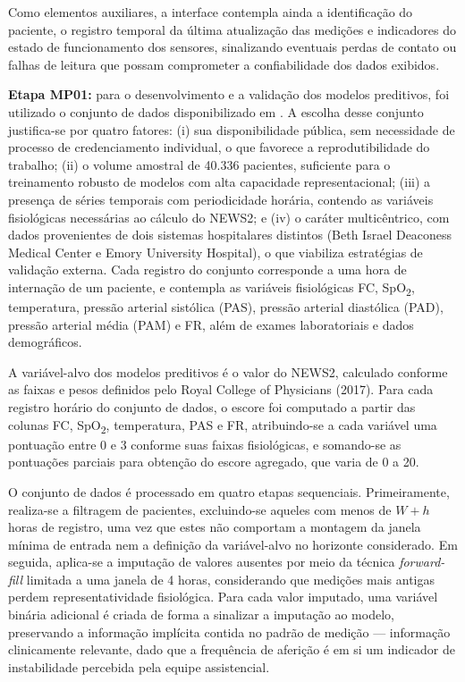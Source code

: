 Como elementos auxiliares, a interface contempla ainda a identificação do paciente, o registro temporal da última atualização das medições e indicadores do estado de funcionamento dos sensores, sinalizando eventuais perdas de contato ou falhas de leitura que possam comprometer a confiabilidade dos dados exibidos.

\textbf{Etapa MP01:} para o desenvolvimento e a validação dos modelos preditivos, foi utilizado o conjunto de dados disponibilizado em \cite{REYNA}. A escolha desse conjunto justifica-se por quatro fatores: (i) sua disponibilidade pública, sem necessidade de processo de credenciamento individual, o que favorece a reprodutibilidade do trabalho; (ii) o volume amostral de 40.336 pacientes, suficiente para o treinamento robusto de modelos com alta capacidade representacional; (iii) a presença de séries temporais com periodicidade horária, contendo as variáveis fisiológicas necessárias ao cálculo do NEWS2; e (iv) o caráter multicêntrico, com dados provenientes de dois sistemas hospitalares distintos (Beth Israel Deaconess Medical Center e Emory University Hospital), o que viabiliza estratégias de validação externa.
Cada registro do conjunto corresponde a uma hora de internação de um paciente, e contempla as variáveis fisiológicas FC, SpO\textsubscript{2}, temperatura, pressão arterial sistólica (PAS), pressão arterial diastólica (PAD), pressão arterial média (PAM) e FR, além de exames laboratoriais e dados demográficos.

A variável-alvo dos modelos preditivos é o valor do NEWS2, calculado conforme as faixas e pesos definidos pelo Royal College of Physicians (2017). Para cada registro horário do conjunto de dados, o escore foi computado a partir das colunas FC, SpO\textsubscript{2}, temperatura, PAS e FR, atribuindo-se a cada variável uma pontuação entre 0 e 3 conforme suas faixas fisiológicas, e somando-se as pontuações parciais para obtenção do escore agregado, que varia de 0 a 20.

O conjunto de dados é processado em quatro etapas sequenciais. Primeiramente, realiza-se a filtragem de pacientes, excluindo-se aqueles com menos de $W + h$ horas de registro, uma vez que estes não comportam a montagem da janela mínima de entrada nem a definição da variável-alvo no horizonte considerado. Em seguida, aplica-se a imputação de valores ausentes por meio da técnica \textit{forward-fill} limitada a uma janela de 4 horas, considerando que medições mais antigas perdem representatividade fisiológica. Para cada valor imputado, uma variável binária adicional é criada de forma a sinalizar a imputação ao modelo, preservando a informação implícita contida no padrão de medição --- informação clinicamente relevante, dado que a frequência de aferição é em si um indicador de instabilidade percebida pela equipe assistencial.

